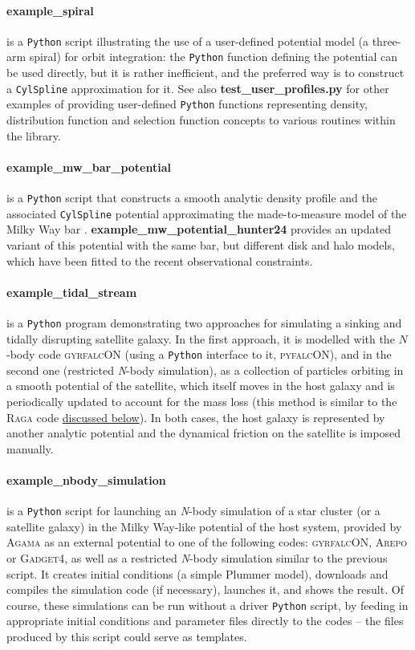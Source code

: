 \documentclass[12pt]{article}
\newcommand{\Agama}{\textsc{Agama}\xspace}
\newcommand{\Nbody}{\textsl{N}-body\xspace}
\newcommand{\Python}{\texttt{Python}\xspace}
\newcommand{\ppp}[1]{\textcolor{darkolive} {\texttt{#1}}}
\let\oldparagraph\paragraph
\renewcommand{\paragraph}[1]{\vspace{-2mm}\oldparagraph{#1}}
\begin{document}
\paragraph{example_spiral} \label{sec:ExampleSpiral} is a \Python script illustrating the use of a user-defined potential model (a three-arm spiral) for orbit integration: the \Python function defining the potential can be used directly, but it is rather inefficient, and the preferred way is to construct a \ppp{CylSpline} approximation for it. See also \textbf{test\_user\_profiles.py} for other examples of providing user-defined \Python functions representing density, distribution function and selection function concepts to various routines within the library.

\paragraph{example_mw_bar_potential} is a \Python script that constructs a smooth analytic density profile \cite{Sormani2022b} and the associated \ppp{CylSpline} potential approximating the made-to-measure model of the Milky Way bar \cite{Portail2017}.
\textbf{example_mw_potential_hunter24} provides an updated variant of this potential \cite{Hunter2024} with the same bar, but different disk and halo models, which have been fitted to the recent observational constraints.

\paragraph{example_tidal_stream} is a \Python program demonstrating two approaches for simulating a sinking and tidally disrupting satellite galaxy. In the first approach, it is modelled with the $N$-body code \textsc{gyrfalcON} (using a \Python interface to it, \textsc{pyfalcON}), and in the second one (restricted \Nbody simulation), as a collection of particles orbiting in a smooth potential of the satellite, which itself moves in the host galaxy and is periodically updated to account for the mass loss (this method is similar to the \textsc{Raga} code \hyperref[sec:raga]{discussed below}). In both cases, the host galaxy is represented by another analytic potential and the dynamical friction on the satellite is imposed manually.

\paragraph{example_nbody_simulation} is a \Python script for launching an \Nbody simulation of a star cluster (or a satellite galaxy) in the Milky Way-like potential of the host system, provided by \Agama as an external potential to one of the following codes: \textsc{gyrfalcON}, \textsc{Arepo} or \textsc{Gadget4}, as well as a restricted \Nbody simulation similar to the previous script. It creates initial conditions (a simple Plummer model), downloads and compiles the simulation code (if necessary), launches it, and shows the result. Of course, these simulations can be run without a driver \Python script, by feeding in appropriate initial conditions and parameter files directly to the codes -- the files produced by this script could serve as templates.
\end{document}
